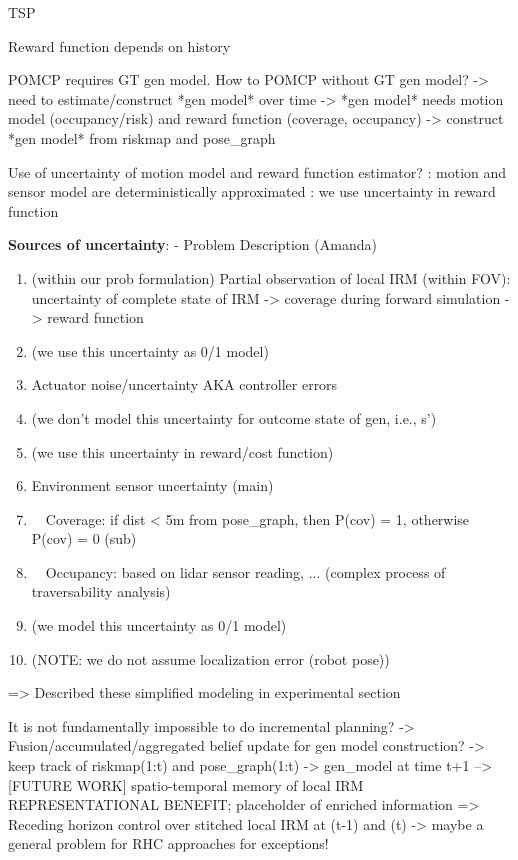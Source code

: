 \documentclass{article}
\newcommand{\ph}[1]{{\textbf{#1}:}} %
\begin{document}
TSP


Reward function depends on history




POMCP requires GT gen model.
How to POMCP without GT gen model?
-> need to estimate/construct *gen model* over time
-> *gen model* needs motion model (occupancy/risk) and reward function (coverage, occupancy)
-> construct *gen model* from riskmap and pose_graph

Use of uncertainty of motion model and reward function estimator?
: motion and sensor model are deterministically approximated
: we use uncertainty in reward function



\ph{Sources of uncertainty} - Problem Description (Amanda)
\begin{enumerate}
    \item (within our prob formulation) Partial observation of local IRM (within FOV): uncertainty of complete state of IRM
    -> coverage during forward simulation -> reward function
    \item (we use this uncertainty as 0/1 model)
    
    \item Actuator noise/uncertainty AKA controller errors
    \item (we don't model this uncertainty for outcome state of gen, i.e., s')
    \item (we use this uncertainty in reward/cost function)
    
    \item Environment sensor uncertainty (main)
    \item \ \ Coverage: if dist < 5m from pose_graph, then P(cov) = 1, otherwise P(cov) = 0 (sub)
    \item \ \ Occupancy: based on lidar sensor reading, ... (complex process of traversability analysis)
    \item (we model this uncertainty as 0/1 model)
    
    \item (NOTE: we do not assume localization error (robot pose))
\end{enumerate}
=> Described these simplified modeling in experimental section


It is not fundamentally impossible to do incremental planning?
-> Fusion/accumulated/aggregated belief update for gen model construction? 
-> keep track of riskmap(1:t) and pose_graph(1:t) -> gen_model at time t+1
--> [FUTURE WORK] spatio-temporal memory of local IRM
    REPRESENTATIONAL BENEFIT; placeholder of enriched information
=> Receding horizon control over stitched local IRM at (t-1) and (t)
-> maybe a general problem for RHC approaches for exceptions!
\end{document}
